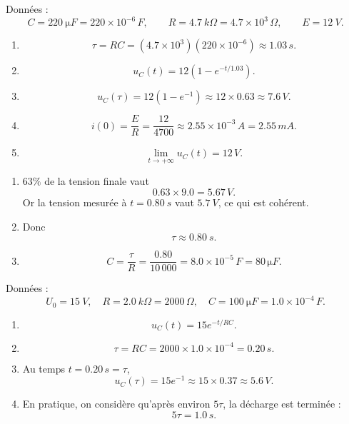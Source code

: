 \documentclass[11pt,a4paper]{article}
\begin{document}
\begin{corrigebox}
Données :
\[
C=\SI{220}{\micro F}=220\times 10^{-6}\,\si{F},
\qquad
R=\SI{4.7}{k\Omega}=4.7\times 10^3\,\si{\Omega},
\qquad
E=\SI{12}{V}.
\]

\begin{enumerate}[label=\alph*)]
    \item
    \[
    \tau=RC=(4.7\times 10^3)(220\times 10^{-6})\approx 1.03\,\si{s}.
    \]

    \item
    \[
    u_C(t)=12\left(1-e^{-t/1.03}\right).
    \]

    \item
    \[
    u_C(\tau)=12(1-e^{-1})\approx 12\times 0.63\approx 7.6\,\si{V}.
    \]

    \item
    \[
    i(0)=\frac{E}{R}=\frac{12}{4700}\approx 2.55\times 10^{-3}\,\si{A}=2.55\,\si{mA}.
    \]

    \item
    \[
    \lim_{t\to+\infty}u_C(t)=12\,\si{V}.
    \]
\end{enumerate}
\end{corrigebox}

\begin{corrigebox}
\begin{enumerate}[label=\alph*)]
    \item \(63\%\) de la tension finale vaut
    \[
    0.63\times 9.0 = 5.67\,\si{V}.
    \]
    Or la tension mesurée à \(t=\SI{0.80}{s}\) vaut \(\SI{5.7}{V}\), ce qui est cohérent.

    \item Donc
    \[
    \tau \approx \SI{0.80}{s}.
    \]

    \item
    \[
    C=\frac{\tau}{R}=\frac{0.80}{10\,000}=8.0\times 10^{-5}\,\si{F}=80\,\si{\micro F}.
    \]
\end{enumerate}
\end{corrigebox}

\begin{corrigebox}
Données :
\[
U_0=\SI{15}{V}, \quad R=\SI{2.0}{k\Omega}=2000\,\si{\Omega}, \quad C=\SI{100}{\micro F}=1.0\times 10^{-4}\,\si{F}.
\]

\begin{enumerate}[label=\alph*)]
    \item
    \[
    u_C(t)=15e^{-t/RC}.
    \]

    \item
    \[
    \tau=RC=2000\times 1.0\times 10^{-4}=0.20\,\si{s}.
    \]

    \item Au temps \(t=0.20\,\si{s}=\tau\),
    \[
    u_C(\tau)=15e^{-1}\approx 15\times 0.37\approx 5.6\,\si{V}.
    \]

    \item En pratique, on considère qu'après environ \(5\tau\), la décharge est terminée :
    \[
    5\tau = 1.0\,\si{s}.
    \]
\end{enumerate}
\end{corrigebox}
\end{document}
